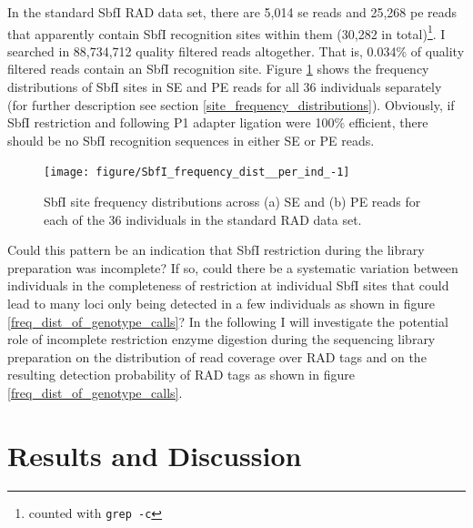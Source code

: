 \documentclass[a4paper,12pt,times,print,index,custombib,custommargin]{PhDThesisPSnPDF}\usepackage[]{graphicx}\usepackage[]{color}
\newenvironment{knitrout}{}{} %
\begin{document}
In the standard SbfI RAD data set, there are 5,014 \gls{se} reads and 25,268 \gls{pe} reads that apparently contain \gls{SbfI} recognition sites within them (30,282 in total)\footnote{counted with \texttt{grep -c}}. I searched in 88,734,712 quality filtered reads altogether. That is, 0.034\% of quality filtered reads contain an SbfI recognition site. Figure \ref{SbfI_frequency_dist_per_ind} shows the frequency distributions of SbfI sites in SE and PE reads for all 36 individuals separately (for further description see section \ref{site_frequency_distributions}). Obviously, if SbfI restriction and following P1 adapter ligation were 100\% efficient, there should be no SbfI recognition sequences in either SE or PE reads. 
%
\begin{figure}[htb]
\centering
\begin{knitrout}
\color{fgcolor}

{\centering \texttt{[image: figure/SbfI\_frequency\_dist\_\_per\_ind\_-1]} 

}



\end{knitrout}
\caption{SbfI site frequency distributions across (a) SE and (b) PE reads for each of the 36 individuals in the standard RAD data set.}
\label{SbfI_frequency_dist_per_ind}
\end{figure}
%
Could this pattern be an indication that SbfI restriction during the library preparation was incomplete? If so, could there be a systematic variation between individuals in the completeness of restriction at individual SbfI sites that could lead to many loci only being detected in a few individuals as shown in figure \ref{freq_dist_of_genotype_calls}?
In the following I will investigate the potential role of incomplete restriction enzyme digestion  during the sequencing library preparation on the distribution of read coverage over \glspl{RAD tag} and on the resulting detection probability of RAD tags as shown in figure \ref{freq_dist_of_genotype_calls}.  


\FloatBarrier
\section{Results and Discussion}

\FloatBarrier
\end{document}
